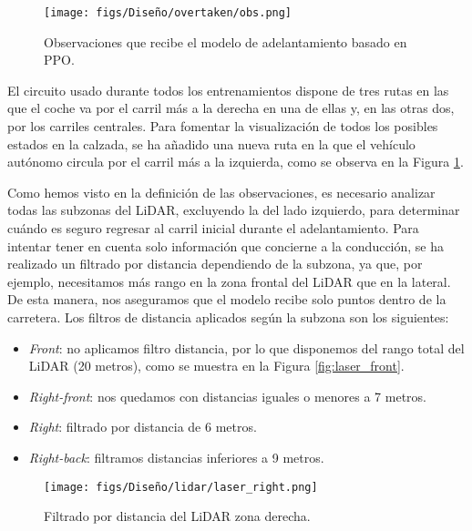 \begin{figure}[ht]
\centering
\texttt{[image: figs/Diseño/overtaken/obs.png]}
\caption{Observaciones que recibe el modelo de adelantamiento basado en \ac{PPO}.}
\label{fig:obs_overtaken}
\end{figure}

El circuito usado durante todos los entrenamientos dispone de tres rutas en las que el coche va por el carril más a la derecha en una de ellas y, en las otras dos, por los carriles centrales. Para fomentar la visualización de todos los posibles estados en la calzada, se ha añadido una nueva ruta en la que el vehículo autónomo circula por el carril más a la izquierda, como se observa en la Figura \ref{fig:obs_overtaken}.

Como hemos visto en la definición de las observaciones, es necesario analizar todas las subzonas del \ac{LiDAR}, excluyendo la del lado izquierdo, para determinar cuándo es seguro regresar al carril inicial durante el adelantamiento. Para intentar tener en cuenta solo información que concierne a la conducción, se ha realizado un filtrado por distancia dependiendo de la subzona, ya que, por ejemplo, necesitamos más rango en la zona frontal del \ac{LiDAR} que en la lateral. De esta manera, nos aseguramos que el modelo recibe solo puntos dentro de la carretera. Los filtros de distancia aplicados según la subzona son los siguientes:
\begin{itemize}
\item \textit{Front}: no aplicamos filtro distancia, por lo que disponemos del rango total del \ac{LiDAR} (20 metros), como se muestra en la Figura \ref{fig:laser_front}.
\item \textit{Right-front}: nos quedamos con distancias iguales o menores a 7 metros.
\item \textit{Right}: filtrado por distancia de 6 metros.
\item \textit{Right-back}: filtramos distancias inferiores a 9 metros.
\end{itemize}

\begin{figure}[ht]
\centering
\texttt{[image: figs/Diseño/lidar/laser\_right.png]}
\caption{Filtrado por distancia del \ac{LiDAR} zona derecha.}
\label{fig:laser_right}
\end{figure}

